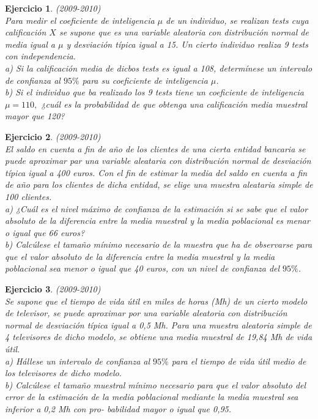 \documentclass[12pt, a4paper]{amsart}
\newtheorem{ejer}{Ejercicio}
\begin{document}
\begin{ejer}\em (2009-2010)\\
Para medir el coeficiente de inteligencia $\mu$ de un individuo, se realizan tests cuya calificación $X$ se supone que es una variable aleatoria con distribución normal de media igual a $\mu$ y desviación
típica igual a 15. Un cierto individuo realiza 9 tests con independencia.\\
a) Si la calificación media de dicbos tests es igual a 108, determínese
un intervalo de confianza
al $95\%$ para su coeficiente de inteligencia $\mu$.\\
b) Si el individuo que ba realizado los 9 tests tiene un coeficiente de inteligencia $\mu=110,$ ¿cuál es la probabilidad de que obtenga una calificación media muestral mayor que 120?
\end{ejer}

\begin{ejer}\em (2009-2010)\\
El saldo en cuenta a fin de año de los clientes de una cierta entidad bancaria se puede aproximar
par una variable aleataria con distribución normal de desviación típica igual a 400 euros. Con
el fin de estimar la media del saldo en cuenta a fin de año para los clientes de dicha entidad, se
elige una muestra aleataria simple de 100 clientes.\\
a) ¿Cuál es el nivel máximo de confianza de la estimación si se sabe que el valor absoluto de la
diferencia entre la media muestral y la media poblacional es menar o igual que 66 euros?\\
b) Calcúlese el tamaño mínimo necesario de la muestra que ha de observarse para que el valor
absoluto de la diferencia entre la media muestral y la media poblacional sea menor o igual que
40 euros, con un nivel de confianza del $95\%$.
\end{ejer}

\begin{ejer}\em (2009-2010)\\
Se supone que el tiempo de vida útil en miles de horas (Mh) de un cierto modelo de televisor, se
puede aproximar por una variable aleatoria con distribución normal de desviación típica igual
a 0,5 Mh. Para una muestra aleatoria simple de 4 televisores de dicho modelo, se obtiene una
media muestral de 19,84 Mh de vida útil.\\
a) Hállese un intervalo de confianza al $95\%$ para el tiempo de vida útil medio de los televisores
de dicho modelo.\\
b) Calcúlese el tamaño muestral mínimo necesario para que el valor absoluto del error de la
estimación de la media poblacional mediante la media muestral sea inferior a 0,2 Mh con pro-
babilidad mayor o igual que 0,95.
\end{ejer}
\end{document}
